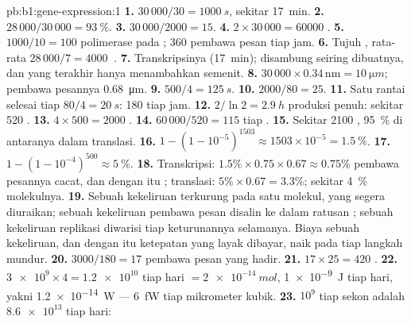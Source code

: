 \begin{solution}{pb:b1:gene-expression:1}
\textbf{1.} $30\,000/30 = \qty{1000}{s}$, sekitar \qty{17}{min}.
\textbf{2.} $28\,000/30\,000 = \qty{93}{\%}$.
\textbf{3.} $30\,000/2000 = 15$.
\textbf{4.} $2\times 30\,000 = \num{60000}$ .
\textbf{5.} $1000/10 = 100$ polimerase pada ; 360 pembawa pesan
tiap jam.
\textbf{6.} Tujuh , rata-rata $28\,000/7 = \qty{4000}{}$ .
\textbf{7.} Transkripsinya (\qty{17}{min});  disambung seiring
dibuatnya, dan yang terakhir hanya menambahkan semenit.
\textbf{8.}  $30\,000\times 0.34\,\mathrm{nm} = \qty{10}{\micro m}$; pembawa pesannya \qty{0.68}{\micro m}.
\textbf{9.} $500/4 = \qty{125}{s}$.
\textbf{10.} $2000/80 = 25$.
\textbf{11.} Satu rantai selesai tiap $80/4 = \qty{20}{s}$: 180 tiap
jam.
\textbf{12.} $2/\ln 2 = \qty{2.9}{h}$ produksi penuh: sekitar 520
.
\textbf{13.} $4\times 500 = 2000$ .
\textbf{14.} $60\,000/520 = 115$  tiap .
\textbf{15.} Sekitar 2100 , \qty{95}{\%} di antaranya dalam translasi.
\textbf{16.} $1 - (1 - 10^{-5})^{1503} \approx 1503\times 10^{-5} =
\qty{1.5}{\%}$.
\textbf{17.} $1 - (1 - 10^{-4})^{500} \approx \qty{5}{\%}$.
\textbf{18.} Transkripsi: $1.5\%\times 0.75\times 0.67 \approx
0.75\%$ pembawa pesannya cacat, dan dengan itu ; translasi:
$5\%\times 0.67 = 3.3\%$; sekitar \qty{4}{\%} molekulnya.
\textbf{19.} Sebuah kekeliruan  terkurung pada satu molekul,
yang segera diuraikan; sebuah kekeliruan pembawa pesan disalin ke dalam
ratusan ; sebuah kekeliruan replikasi diwarisi tiap
keturunannya selamanya. Biaya sebuah kekeliruan, dan dengan itu
ketepatan yang layak dibayar, naik pada tiap langkah mundur.
\textbf{20.} $3000/180 = 17$ pembawa pesan yang hadir.
\textbf{21.} $17\times 25 = 420$ .
\textbf{22.} $\num{3e9}\times 4 = \num{1.2e10}$  tiap hari
$= \qty{2e-14}{mol}$, \qty{1e-9}{J} tiap hari, yakni \qty{1.2e-14}{W}
--- \qty{6}{fW} tiap mikrometer kubik.
\textbf{23.} $10^9$  tiap sekon adalah $\num{8.6e13}$ tiap hari:

\end{solution}
